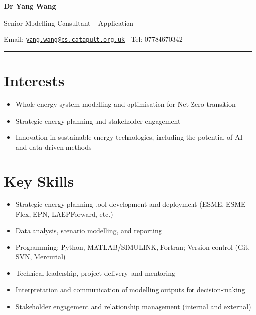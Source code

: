 \documentclass[letterpaper]{article}
\def\name{Dr Yang Wang}
\begin{document}

\centerline{\LARGE \bf Dr Yang Wang}
\vspace{0.05in}
\centerline{\large Senior Modelling Consultant – Application}

\begin{minipage}{\linewidth}
\begin{center}
Email: \href{mailto:yang.wang@es.catapult.org.uk}{\tt yang.wang@es.catapult.org.uk} , Tel: 07784670342 \\
\end{center}
\end{minipage}

\rule{\textwidth}{1pt}

\section*{Interests}
\begin{itemize}
\item Whole energy system modelling and optimisation for Net Zero transition
\item Strategic energy planning and stakeholder engagement
\item Innovation in sustainable energy technologies, including the potential of AI and data-driven methods
\end{itemize}

\section*{Key Skills}
\begin{itemize}
\item Strategic energy planning tool development and deployment (ESME, ESME-Flex, EPN, LAEPForward, etc.)
\item Data analysis, scenario modelling, and reporting
\item Programming: Python, MATLAB/SIMULINK, Fortran; Version control (Git, SVN, Mercurial)
\item Technical leadership, project delivery, and mentoring
\item Interpretation and communication of modelling outputs for decision-making
\item Stakeholder engagement and relationship management (internal and external)
\end{itemize}
\end{document}
